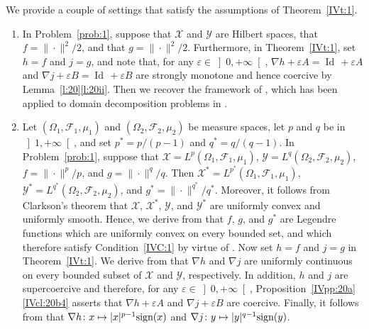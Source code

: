 \documentclass[a4paper,11pt,fleqn]{article}
\newcommand{\XX}{\ensuremath{{\mathcal X}}}
\newcommand{\YY}{\ensuremath{{\mathcal Y}}}
\newcommand{\Id}{\ensuremath{\operatorname{Id}}\,}
\newcommand{\RPP}{\ensuremath{\left]0,+\infty\right[}}
\newcommand{\pinf}{\ensuremath{{+\infty}}}
\newcommand{\sign}{\ensuremath{\text{\rm sign}}}
\theoremstyle{plain}{\theorembodyfont{\rmfamily}%
\newtheorem{conjecture}[theorem]{Conjecture}}
\theoremstyle{plain}{\theorembodyfont{\rmfamily}%
\newtheorem{example}[theorem]{Example}}
\theoremstyle{plain}{\theorembodyfont{\rmfamily}%
\newtheorem{remark}[theorem]{Remark}}
\theoremstyle{plain}{\theorembodyfont{\rmfamily}%
\newtheorem{algorithm}[theorem]{Algorithm}}
\theoremstyle{plain}{\theorembodyfont{\rmfamily}%
\newtheorem{condition}[theorem]{Condition}}
\theoremstyle{plain}{\theorembodyfont{\rmfamily}%
\newtheorem{definition}[theorem]{Definition}}
\theoremstyle{plain}{\theorembodyfont{\rmfamily}
\newtheorem{problem}[theorem]{Problem}}
\theoremstyle{plain}{\theorembodyfont{\rmfamily}
\newtheorem{notation}[theorem]{Notation}}
\numberwithin{equation}{section}
\begin{document}
\begin{remark}
\label{IVrKKnhf74g31}
We provide a couple of settings that satisfy the assumptions of
Theorem~\ref{IVt:1}.
\begin{enumerate}
\item
In Problem~\ref{prob:1}, suppose that $\XX$ and $\YY$ are Hilbert 
spaces, that $f=\|\cdot\|^2/2$, and that $g=\|\cdot\|^2/2$.
Furthermore, in Theorem~\ref{IVt:1}, set $h=f$ and $j=g$, and note
that, for any $\varepsilon\in\RPP$, 
$\nabla h+\varepsilon A=\Id+\varepsilon A$ and 
$\nabla j+\varepsilon B=\Id+\varepsilon B$ are strongly monotone 
and hence coercive by Lemma~\ref{l:20}\ref{l:20ii}.
Then we recover the framework of \cite{Nfao15}, 
which has been applied to domain decomposition problems in 
\cite{Atto15}. 
\item
Let $(\Omega_1,\mathcal{F}_1,\mu_1)$ and
$(\Omega_2,\mathcal{F}_2,\mu_2)$ be measure spaces,
let $p$ and $q$ be in $\left]1,\pinf\right[$, and set
$p^*=p/(p-1)$ and $q^*=q/(q-1)$. In Problem~\ref{prob:1}, suppose 
that $\XX=L^p(\Omega_1,\mathcal{F}_1,\mu_1)$, 
$\YY=L^q(\Omega_2,\mathcal{F}_2,\mu_2)$, $f=\|\cdot\|^p/p$, 
and $g=\|\cdot\|^q/q$. Then
$\XX^*=L^{p^*}(\Omega_1,\mathcal{F}_1,\mu_1)$,
$\YY^*=L^{q^*}(\Omega_2,\mathcal{F}_2,\mu_2)$, and
$g^*=\|\cdot\|^{q^*}/q^*$. Moreover, 
it follows from Clarkson's theorem 
\cite[Theorem~II.4.7]{IVCi90_B} that $\XX$, $\XX^*$,
$\YY$, and $\YY^*$ are uniformly convex and uniformly smooth.
Hence, we derive from \cite[Corollary~5.5 and Example~6.5]{Ccm01} 
that $f$, $g$, and $g^*$ are Legendre functions which are 
uniformly convex on every bounded set, and which therefore 
satisfy Condition~\ref{IVC:1} by virtue of 
\cite[Example~4.10(i)]{Sico03}. 
Now set $h=f$ and $j=g$ in Theorem~\ref{IVt:1}.
We derive from 
\cite[Theorem~II.2.16(i)]{IVCi90_B} that $\nabla h$ and $\nabla j$ 
are uniformly continuous on every bounded subset of $\XX$ and 
$\YY$, respectively. 
In addition, $h$ and $j$ are supercoercive and therefore,
for any $\varepsilon\in\RPP$, 
Proposition~\ref{IVpp:20a}\ref{IVcl:20b4} asserts that 
$\nabla h+\varepsilon A$ and $\nabla j+\varepsilon B$ are 
coercive. Finally, it follows from 
\cite[Proposition~II.4.9]{IVCi90_B} that
$\nabla h\colon x\mapsto |x|^{p-1}\sign(x)$ and 
$\nabla j\colon y\mapsto |y|^{q-1}\sign(y)$.
\end{enumerate}
\end{remark}
\end{document}
